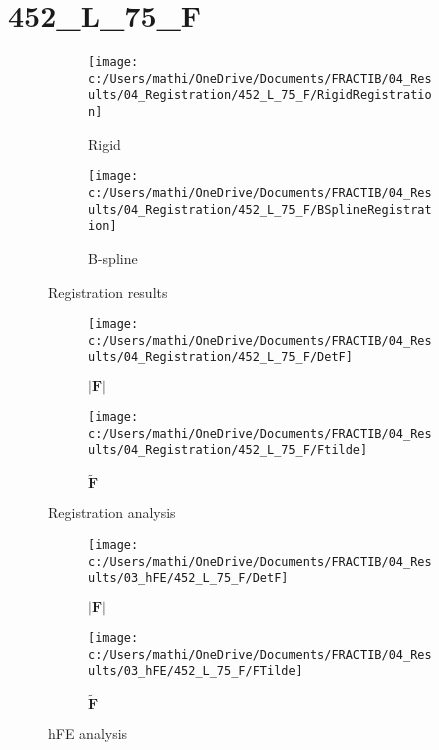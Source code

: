 \documentclass{article}%
\begin{document}
%
\newpage%
\section*{452\_L\_75\_F}%
\label{sec:452L75F}%


\begin{figure}[h!]%
\begin{subfigure}[b]{0.5\linewidth}%
\texttt{[image: c:/Users/mathi/OneDrive/Documents/FRACTIB/04\_Results/04\_Registration/452\_L\_75\_F/RigidRegistration]}%
\caption{Rigid}%
\end{subfigure}%
\begin{subfigure}[b]{0.5\linewidth}%
\texttt{[image: c:/Users/mathi/OneDrive/Documents/FRACTIB/04\_Results/04\_Registration/452\_L\_75\_F/BSplineRegistration]}%
\caption{B{-}spline}%
\end{subfigure}%
\caption{Registration results}%
\end{figure}

%


\begin{figure}[h!]%
\begin{subfigure}[b]{0.5\linewidth}%
\texttt{[image: c:/Users/mathi/OneDrive/Documents/FRACTIB/04\_Results/04\_Registration/452\_L\_75\_F/DetF]}%
\caption{$|\mathbf{F}|$}%
\end{subfigure}%
\begin{subfigure}[b]{0.5\linewidth}%
\texttt{[image: c:/Users/mathi/OneDrive/Documents/FRACTIB/04\_Results/04\_Registration/452\_L\_75\_F/Ftilde]}%
\caption{$\tilde{\mathbf{F}}$}%
\end{subfigure}%
\caption{Registration analysis}%
\end{figure}

%


\begin{figure}[h!]%
\begin{subfigure}[b]{0.5\linewidth}%
\texttt{[image: c:/Users/mathi/OneDrive/Documents/FRACTIB/04\_Results/03\_hFE/452\_L\_75\_F/DetF]}%
\caption{$|\mathbf{F}|$}%
\end{subfigure}%
\begin{subfigure}[b]{0.5\linewidth}%
\texttt{[image: c:/Users/mathi/OneDrive/Documents/FRACTIB/04\_Results/03\_hFE/452\_L\_75\_F/FTilde]}%
\caption{$\tilde{\mathbf{F}}$}%
\end{subfigure}%
\caption{hFE analysis}%
\end{figure}
\end{document}
